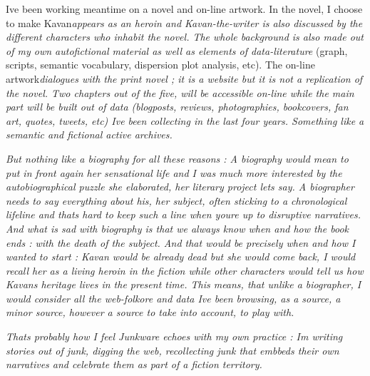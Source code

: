 I{\textquotesingle}ve been working meantime on a novel and on-line
artwork. In the novel, I choose to make
Kavan\textit{\textup{appears as an heroin and
Kavan-the-writer is also discussed by the different characters who
inhabit the novel. The whole background is also made out of my own
autofictional material as well as elements of data-literature}} (graph,
scripts, semantic vocabulary, dispersion plot analysis, etc). The
on-line artwork\textit{\textup{dialogues with the print
novel ; it is a website but it is not a replication of the novel. Two
chapters out of the five, will be accessible on-line while the main
part will be built out of data (blogposts, reviews, photographies,
bookcovers, fan art, quotes, tweets, etc) I{\textquotesingle}ve been
collecting in the last four years. Something like a semantic and
fictional active archives. }}

\textit{\textup{But nothing like a biography for all these
reasons : A biography would mean to put in front again her sensational
life and I was much more interested by the autobiographical puzzle she
elaborated, her literary project let{\textquotesingle}s say. A
biographer needs to say everything about his, her subject, often
sticking to a chronological lifeline and that{\textquotesingle}s hard
to keep such a line when you{\textquotesingle}re up to disruptive
narratives. And what is sad with biography is that we always know when
and how the book ends : with the death of the subject. And that would
be precisely when and how I wanted to start : Kavan would be already
dead but she would come back, I would recall her as a living heroin in
the fiction while other characters would tell us how
Kavan{\textquotesingle}s heritage lives in the present time. This
means, that unlike a biographer, I would consider all the web-folkore
and data I{\textquotesingle}ve been browsing, as a source, a minor
source, however a source to take into account, to play with.}}

\textit{\textup{That{\textquotesingle}s probably how I feel
Junkware echoes with my own practice : I{\textquotesingle}m writing
stories out of junk, digging the web, recollecting junk that embbeds
their own narratives and celebrate them as part of a fiction
territory.}}
